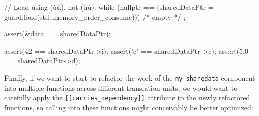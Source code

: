 \begin{emcppslisting}
{    // Load using (ù{}ù), not (ù{}ù).                                 
    while (nullptr == (sharedDataPtr = guard.load(std::memory_order_consume)))  
        /* empty */ ;                                                           
                                                                                
    assert(&data == sharedDataPtr);                                             
                                                                                
    assert(42  == sharedDataPtr->i);                                            
    assert('c' == sharedDataPtr->c);                                            
    assert(5.0 == sharedDataPtr->d);                                            
}
\end{emcppslisting}
    
\noindent Finally, if we want to start to refactor the work of
the \lstinline!my_sharedata! component into multiple 
 functions across different
translation units, we would want to carefully apply the 
\lstinline![[carries_dependency]]! attribute to the newly refactored
functions, so calling into these functions might conceivably be better
optimized:

